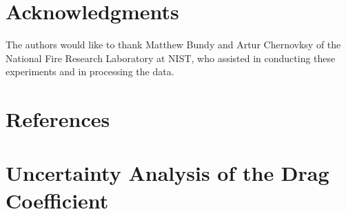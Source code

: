 \documentclass[12pt]{article}
\begin{document}
\section*{Acknowledgments}

\noindent The authors would like to thank Matthew Bundy and Artur Chernovksy of the National Fire Research Laboratory at NIST, who assisted in conducting these experiments and in processing the data.   \\
\pagebreak
\section*{References}


\pagebreak


\appendix
{}
\makeatletter
\newcommand{\section@cntformat}{Appendix:\ }
\makeatother
\section{Uncertainty Analysis of the Drag Coefficient} \label{sec:UncertaintyDrag}
\end{document}
